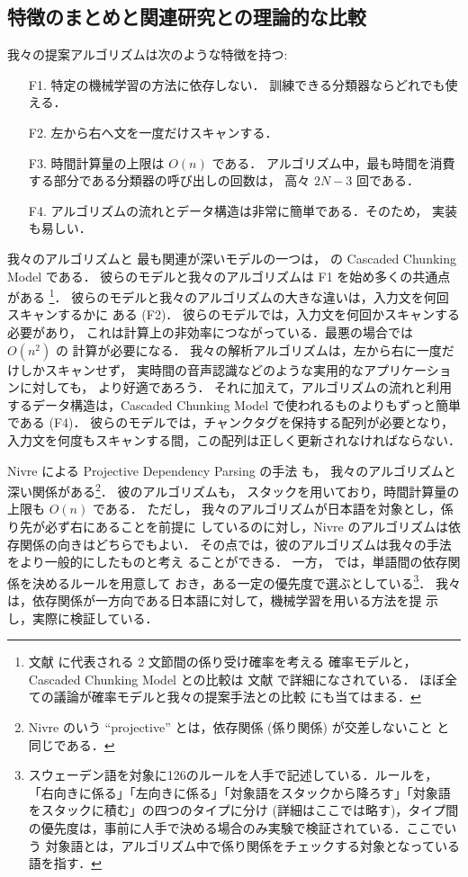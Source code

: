 \documentclass[japanese]{jnlp_1.2c}
\begin{document}
\subsection{特徴のまとめと関連研究との理論的な比較}\label{comp:theory}
我々の提案アルゴリズムは次のような特徴を持つ:
    \begin{itemize} 
\item[F1.] 特定の機械学習の方法に依存しない．
訓練できる分類器ならどれでも使える．
\item[F2.] 左から右へ文を一度だけスキャンする．
\item[F3.] 時間計算量の上限は $O(n)$ である．
アルゴリズム中，最も時間を消費する部分である分類器の呼び出しの回数は，
高々 $2N - 3$ 回である．
\item[F4.] アルゴリズムの流れとデータ構造は非常に簡単である．そのため，
実装も易しい．
    \end{itemize}

我々のアルゴリズムと
最も関連が深いモデルの一つは，\cite{Kudo2002} の \linebreak
Cascaded Chunking
 Model である．
彼らのモデルと我々のアルゴリズムは F1 を始め多くの共通点がある
\footnote{
文献 \cite{Uchimoto1999} に代表される 2 文節間の係り受け確率を考える
確率モデルと，Cascaded Chunking Model との比較は
文献 \cite{Kudo2002} で詳細になされている．
ほぼ全ての議論が確率モデルと我々の提案手法との比較
にも当てはまる．
}．
彼らのモデルと我々のアルゴリズムの大きな違いは，入力文を何回スキャンするかに
ある (F2)．
彼らのモデルでは，入力文を何回かスキャンする必要があり，
これは計算上の非効率につながっている．最悪の場合では $O(n^{2})$ の
計算が必要になる．
我々の解析アルゴリズムは，左から右に一度だけしかスキャンせず，
実時間の音声認識などのような実用的なアプリケーションに対しても，
より好適であろう．
それに加えて，アルゴリズムの流れと利用するデータ構造は，Cascaded Chunking
Model で使われるものよりもずっと簡単である (F4)．
彼らのモデルでは，チャンクタグを保持する配列が必要となり，
入力文を何度もスキャンする間，この配列は正しく更新されなければならない．

Nivre による Projective Dependency Parsing の手法 \cite{Nivre2003} も，
我々のアルゴリズムと深い関係がある\footnote{
Nivre のいう ``projective'' とは，依存関係 (係り関係) が交差しないこと
と同じである．
}．
彼のアルゴリズムも，
スタックを用いており，時間計算量の上限も $O(n)$ である．
ただし，
我々のアルゴリズムが日本語を対象とし，係り先が必ず右にあることを前提に
しているのに対し，Nivre のアルゴリズムは依存関係の向きはどちらでもよい．
その点では，彼のアルゴリズムは我々の手法をより一般的にしたものと考え
ることができる．
一方，\cite{Nivre2003} では，単語間の依存関係を決めるルールを用意して
おき，ある一定の優先度で選ぶとしている\footnote{
スウェーデン語を対象に126のルールを人手で記述している．ルールを，
「右向きに係る」「左向きに係る」「対象語をスタックから降ろす」「対象語
をスタックに積む」の四つのタイプに分け (詳細はここでは略す)，タイプ間
の優先度は，事前に人手で決める場合のみ実験で検証されている．ここでいう
対象語とは，アルゴリズム中で係り関係をチェックする対象となっている語を指す．
}．
我々は，依存関係が一方向である日本語に対して，機械学習を用いる方法を提
示し，実際に検証している．
\end{document}
